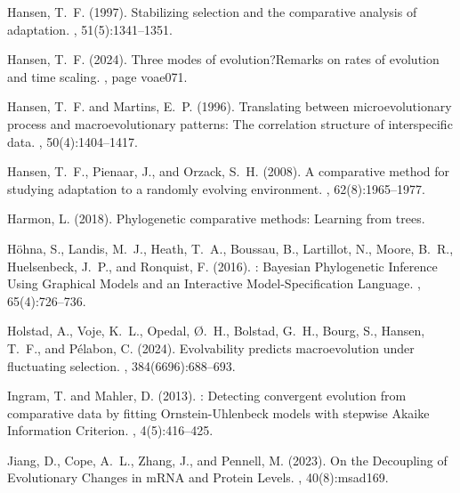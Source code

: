 \documentclass{article}
\begin{document}
\begin{thebibliography}{}
Hansen, T.~F. (1997).
\newblock Stabilizing selection and the comparative analysis of adaptation.
, 51(5):1341--1351.

Hansen, T.~F. (2024).
\newblock Three modes of evolution?{{Remarks}} on rates of evolution and time
  scaling.
, page voae071.

Hansen, T.~F. and Martins, E.~P. (1996).
\newblock Translating between microevolutionary process and macroevolutionary
  patterns: The correlation structure of interspecific data.
, 50(4):1404--1417.

Hansen, T.~F., Pienaar, J., and Orzack, S.~H. (2008).
\newblock A comparative method for studying adaptation to a randomly evolving
  environment.
, 62(8):1965--1977.

Harmon, L. (2018).
\newblock Phylogenetic comparative methods: Learning from trees.

H{\"o}hna, S., Landis, M.~J., Heath, T.~A., Boussau, B., Lartillot, N., Moore,
  B.~R., Huelsenbeck, J.~P., and Ronquist, F. (2016).
: {{Bayesian Phylogenetic Inference Using Graphical
  Models}} and an {{Interactive Model-Specification Language}}.
, 65(4):726--736.

Holstad, A., Voje, K.~L., Opedal, {\O}.~H., Bolstad, G.~H., Bourg, S., Hansen,
  T.~F., and P{\'e}labon, C. (2024).
\newblock Evolvability predicts macroevolution under fluctuating selection.
, 384(6696):688--693.

Ingram, T. and Mahler, D. (2013).
: Detecting convergent evolution from comparative data by
  fitting {{Ornstein-Uhlenbeck}} models with stepwise {{Akaike Information
  Criterion}}.
, 4(5):416--425.

Jiang, D., Cope, A.~L., Zhang, J., and Pennell, M. (2023).
\newblock On the {{Decoupling}} of {{Evolutionary Changes}} in {{mRNA}} and
  {{Protein Levels}}.
, 40(8):msad169.


\end{thebibliography}
\end{document}
